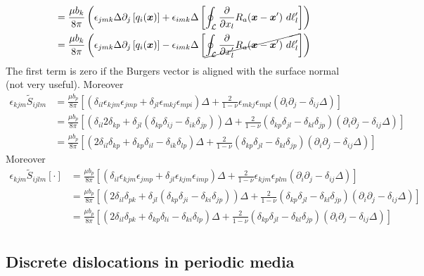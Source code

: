 {\begin{align}
&=\frac{\mu b_k}{8\pi}\left(\epsilon_{jmk}\Delta\partial_j \left[q_i(\bm x)\right]+\epsilon_{imk}\Delta \left[\oint_\mathcal{L} \frac{\partial}{\partial x_l} R_a(\bm x-\bm x')\ d\ell'_l\right]\right)\nonumber\\
&=\frac{\mu b_k}{8\pi}\left(\epsilon_{jmk}\Delta\partial_j \left[q_i(\bm x)\right]-\epsilon_{imk}\Delta \left[\cancel{\oint_\mathcal{L} \frac{\partial}{\partial x'_l} R_a(\bm x-\bm x')\ d\ell'_l}\right]\right)\nonumber
\end{align}
The first term is zero if the Burgers vector is aligned with the surface normal (not very useful).
Moreover
\begin{align}
\epsilon_{kjm}\tilde{S}_{ijlm}
&=\frac{\mu b_p}{8\pi}\left[\left(\delta_{il}\epsilon_{kjm}\epsilon_{jmp}+\delta_{jl}\epsilon_{mkj}\epsilon_{mpi}\right)\Delta+\frac{2}{1-\nu}\epsilon_{mkj}\epsilon_{mpl}\left(\partial_{i}\partial_j-\delta_{ij}\Delta\right)\right]\nonumber\\
&=\frac{\mu b_p}{8\pi}\left[\left(\delta_{il}2\delta_{kp}+\delta_{jl}\left(\delta_{kp}\delta_{ij}-\delta_{ik}\delta_{jp}\right)\right)\Delta+\frac{2}{1-\nu}\left(\delta_{kp}\delta_{jl}-\delta_{kl}\delta_{jp}\right)\left(\partial_{i}\partial_j-\delta_{ij}\Delta\right)\right]\nonumber\\
&=\frac{\mu b_p}{8\pi}\left[\left(2\delta_{il}\delta_{kp}+\delta_{kp}\delta_{il}-\delta_{ik}\delta_{lp}\right)\Delta+\frac{2}{1-\nu}\left(\delta_{kp}\delta_{jl}-\delta_{kl}\delta_{jp}\right)\left(\partial_{i}\partial_j-\delta_{ij}\Delta\right)\right]
\end{align}
}
Moreover
\begin{align}
\epsilon_{kjm}\tilde{S}_{ijlm}[\cdot]
&=\frac{\mu b_p}{8\pi}\left[\left(\delta_{il}\epsilon_{kjm}\epsilon_{jmp}+\delta_{jl}\epsilon_{kjm}\epsilon_{imp}\right)\Delta+\frac{2}{1-\nu}\epsilon_{kjm}\epsilon_{plm}\left(\partial_{i}\partial_j-\delta_{ij}\Delta\right)\right]\nonumber\\
&=\frac{\mu b_p}{8\pi}\left[\left(2\delta_{il}\delta_{pk}+\delta_{jl}(\delta_{kp}\delta_{ji}-\delta_{ki}\delta_{jp})\right)\Delta+\frac{2}{1-\nu}(\delta_{kp}\delta_{jl}-\delta_{kl}\delta_{jp})\left(\partial_{i}\partial_j-\delta_{ij}\Delta\right)\right]\nonumber\\
&=\frac{\mu b_p}{8\pi}\left[\left(2\delta_{il}\delta_{pk}+\delta_{kp}\delta_{li}-\delta_{ki}\delta_{lp}\right)\Delta+\frac{2}{1-\nu}(\delta_{kp}\delta_{jl}-\delta_{kl}\delta_{jp})\left(\partial_{i}\partial_j-\delta_{ij}\Delta\right)\right]\nonumber\\
\end{align}




\subsection{Discrete dislocations in periodic media}